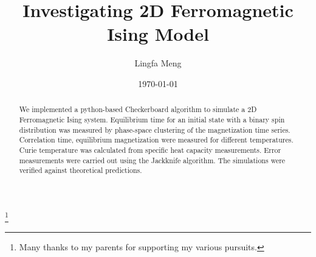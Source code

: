 \documentclass[%
showkeys,
bibnotes,
amsmath,amssymb,
floatfix,
]{revtex4-1}
\begin{document}

\title{Investigating 2D Ferromagnetic Ising Model}%
\thanks{Many thanks to my parents for supporting my various pursuits.}%

\author{Lingfa Meng}

\date{\today}%

\begin{abstract}
We implemented a python-based Checkerboard algorithm \cite{BLOCK20101549} to simulate a 2D Ferromagnetic Ising system. Equilibrium time for an initial state with a binary spin distribution was measured by phase-space clustering of the magnetization time series. Correlation time, equilibrium magnetization were measured for different temperatures. Curie temperature was calculated from specific heat capacity measurements. Error measurements were carried out using the Jackknife algorithm. The simulations were verified against theoretical predictions.

\end{abstract}

\maketitle
\end{document}
